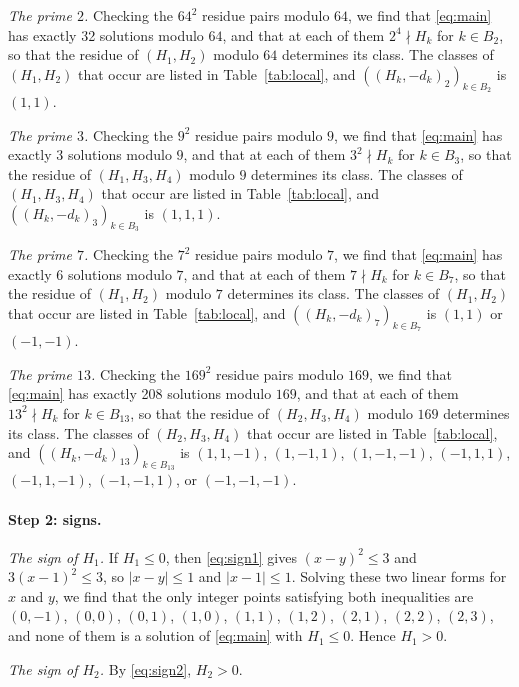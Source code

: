 \documentclass[11pt]{article}
\begin{document}
\emph{The prime $2$.} Checking the $64^2$ residue pairs modulo $64$, we find that \eqref{eq:main} has exactly 32 solutions modulo $64$, and that at each of them $2^{4}\nmid H_k$ for $k\in B_{2}$, so that the residue of $(H_{1},H_{2})$ modulo $64$ determines its class. The classes of $(H_{1},H_{2})$ that occur are listed in Table~\ref{tab:local}, and $((H_k,-d_k)_{2})_{k\in B_{2}}$ is $(1,1)$.

\emph{The prime $3$.} Checking the $9^2$ residue pairs modulo $9$, we find that \eqref{eq:main} has exactly 3 solutions modulo $9$, and that at each of them $3^{2}\nmid H_k$ for $k\in B_{3}$, so that the residue of $(H_{1},H_{3},H_{4})$ modulo $9$ determines its class. The classes of $(H_{1},H_{3},H_{4})$ that occur are listed in Table~\ref{tab:local}, and $((H_k,-d_k)_{3})_{k\in B_{3}}$ is $(1,1,1)$.

\emph{The prime $7$.} Checking the $7^2$ residue pairs modulo $7$, we find that \eqref{eq:main} has exactly 6 solutions modulo $7$, and that at each of them $7\nmid H_k$ for $k\in B_{7}$, so that the residue of $(H_{1},H_{2})$ modulo $7$ determines its class. The classes of $(H_{1},H_{2})$ that occur are listed in Table~\ref{tab:local}, and $((H_k,-d_k)_{7})_{k\in B_{7}}$ is $(1,1)$ or $(-1,-1)$.

\emph{The prime $13$.} Checking the $169^2$ residue pairs modulo $169$, we find that \eqref{eq:main} has exactly 208 solutions modulo $169$, and that at each of them $13^{2}\nmid H_k$ for $k\in B_{13}$, so that the residue of $(H_{2},H_{3},H_{4})$ modulo $169$ determines its class. The classes of $(H_{2},H_{3},H_{4})$ that occur are listed in Table~\ref{tab:local}, and $((H_k,-d_k)_{13})_{k\in B_{13}}$ is $(1,1,-1)$, $(1,-1,1)$, $(1,-1,-1)$, $(-1,1,1)$, $(-1,1,-1)$, $(-1,-1,1)$, or $(-1,-1,-1)$.

\paragraph{Step 2: signs.} \emph{The sign of $H_{1}$.} If $H_{1}\leq0$, then \eqref{eq:sign1} gives $(x-y)^2\leq 3$ and $3(x-1)^2\leq 3$, so $|x-y|\leq1$ and $|x-1|\leq1$. Solving these two linear forms for $x$ and $y$, we find that the only integer points satisfying both inequalities are $(0,-1)$, $(0,0)$, $(0,1)$, $(1,0)$, $(1,1)$, $(1,2)$, $(2,1)$, $(2,2)$, $(2,3)$, and none of them is a solution of \eqref{eq:main} with $H_{1}\leq0$. Hence $H_{1}>0$.

\emph{The sign of $H_{2}$.} By \eqref{eq:sign2}, $H_{2}>0$.
\end{document}
